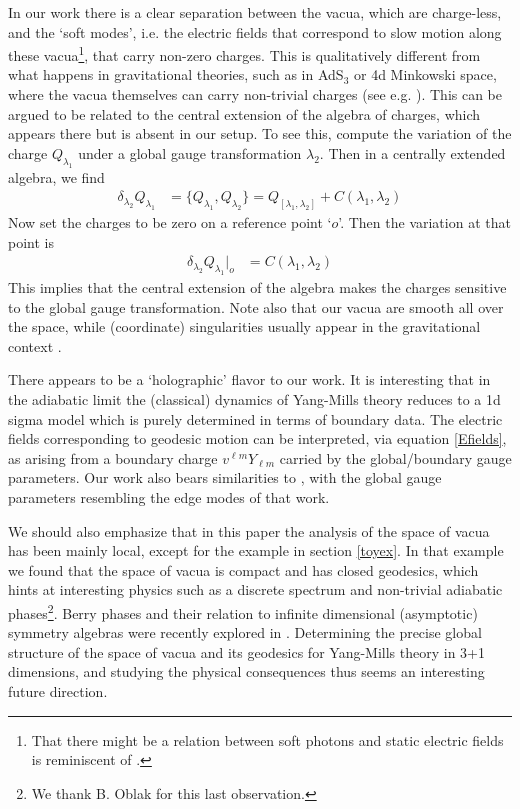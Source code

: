 \documentclass[11pt,a4paper]{article}
\def\l{{\lambda}}
\def\de{\delta}
\begin{document}
In our work there is a clear separation between the vacua, which are charge-less, and the `soft modes', i.e. the electric fields that correspond to slow motion along these vacua\footnote{That there might be a relation between soft photons and static electric fields is reminiscent of \cite{Barnich:2010bu,Muck:2015dea}.}, that carry non-zero charges. This is qualitatively different from what happens in gravitational theories, such as in AdS$_3$ or 4d Minkowski space, where the vacua themselves can carry non-trivial charges (see e.g. \cite{Banados:1998gg,Barnich:2010eb,Sheikh-Jabbari:2016unm,Compere:2016jwb,Oblak:2016eij}). This can be argued to be related to the central extension of the algebra of charges, which appears there but is absent in our setup. To see this, compute the variation of the charge $Q_{\l_1}$ under a global gauge transformation $\l_2$. Then in a centrally extended algebra, we find 
    \begin{align*}
    \de_{\l_2}Q_{\l_1}&=\{Q_{\l_1},Q_{\l_2}\}=Q_{[\l_1,\l_2]}+C(\l_1,\l_2)
    \end{align*}
    Now set the charges to be zero on a reference point `$o$'. Then the variation at that point is 
    \begin{align*}
    \de_{\l_2}Q_{\l_1}\Big\vert_o&=C(\l_1,\l_2)
    \end{align*}
    This implies that the central extension of the algebra makes the charges sensitive to the global gauge transformation. Note also that our vacua are smooth all over the space, while (coordinate) singularities usually appear in the gravitational context \cite{Strominger:2016wns, Compere:2016jwb}.
    
    There appears to be a `holographic' flavor to our work. It is interesting that in the adiabatic limit the (classical) dynamics of Yang-Mills theory reduces to a 1d sigma model which is purely determined in terms of boundary data. The electric fields corresponding to geodesic motion can be interpreted, via equation \eqref{Efields}, as arising from a boundary charge $v^{\ell m} Y_{\ell m}$ carried by the global/boundary gauge parameters. Our work also bears similarities to \cite{Donnelly:2014fua,Donnelly:2016auv,Geiller:2017xad}, with the global gauge parameters resembling the edge modes of that work.
    
    We should also emphasize that in this paper the analysis of the space of vacua has been mainly local, except for the example in section \ref{toyex}. In that example we found that the space of vacua is compact and has closed geodesics, which hints at interesting physics such as a discrete spectrum and non-trivial adiabatic phases\footnote{We thank B. Oblak for this last observation.}. Berry phases and their relation to infinite dimensional (asymptotic) symmetry algebras were recently explored in \cite{Oblak:2017ect}. Determining the precise global structure of the space of vacua and its geodesics for Yang-Mills theory in 3+1 dimensions, and studying the physical consequences thus seems an interesting future direction.
    
\end{document}
